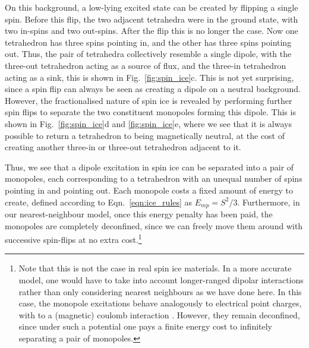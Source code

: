 On this background, a low-lying excited state can be created by flipping a single spin. Before this flip, the two adjacent tetrahedra were in the ground state, with two in-spins and two out-spins. After the flip this is no longer the case. Now one tetrahedron has three spins pointing in, and the other has three spins pointing out. Thus, the pair of tetrahedra collectively resemble a single dipole, with the three-out tetrahedron acting as a source of flux, and the three-in tetrahedron acting as a sink, this is shown in Fig.~\ref{fig:spin_ice}c. This is not yet surprising, since a spin flip can always be seen as creating a dipole on a neutral background. However, the fractionalised nature of spin ice is revealed by performing further spin flips to separate the two constituent monopoles forming this dipole. This is shown in Fig.~\ref{fig:spin_ice}d and \ref{fig:spin_ice}e, where we see that it is always possible to return a tetrahedron to being magnetically neutral, at the cost of creating another three-in or three-out tetrahedron adjacent to it. 

Thus, we see that a dipole excitation in spin ice can be separated into a pair of monopoles, each corresponding to a tetrahedron with an unequal number of spins pointing in and pointing out. Each monopole costs a fixed amount of energy to create, defined according to Eqn.~\ref{eqn:ice_rules} as $E_{mp} = S^2/3$. Furthermore, in our nearest-neighbour model, once this energy penalty has been paid, the monopoles are completely deconfined, since we can freely move them around with successive spin-flips at no extra cost.\footnote{Note that this is not the case in real spin ice materials. In a more accurate model, one would have to take into account longer-ranged dipolar interactions rather than only considering nearest neighbours as we have done here. In this case, the monopole excitations behave analogously to electrical point charges, with to a (magnetic) coulomb interaction \cite{castelnovo_spin_2012}. However, they remain deconfined, since under such a potential one pays a finite energy cost to infinitely separating a pair of monopoles.}

